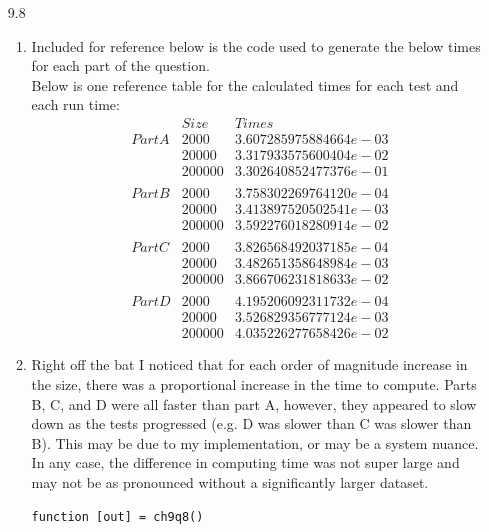 \documentclass[11pt,a4paper]{article}
\begin{document}
\begin{itemize}
			\item[9.8]
				\begin{enumerate} [label={\alph*)}]
					\item Included for reference below is the code used to generate the below times for each part of the question. \\ Below is one reference table for the calculated times for each test and each run time:
					$$\begin{array}{ccc}
						       & Size & Times \\ \hline
						Part A & 2000    & 3.607285975884664e-03 \\
						       & 20000   & 3.317933575600404e-02 \\
						       & 200000  & 3.302640852477376e-01 \\
						       &         &						 \\
						Part B & 2000    & 3.758302269764120e-04 \\
						       & 20000   & 3.413897520502541e-03 \\
						       & 200000  & 3.592276018280914e-02 \\
						       &         &						 \\
						Part C & 2000    & 3.826568492037185e-04 \\
						       & 20000   & 3.482651358648984e-03 \\
						       & 200000  & 3.866706231818633e-02 \\
						       &         &						 \\
						Part D & 2000    & 4.195206092311732e-04 \\
						       & 20000   & 3.526829356777124e-03 \\
						       & 200000  & 4.035226277658426e-02 
		
					\end{array}$$
					\item Right off the bat I noticed that for each order of magnitude increase in the size, there was a proportional increase in the time to compute. Parts B, C, and D were all faster than part A, however, they appeared to slow down as the tests progressed (e.g. D was slower than C was slower than B). This may be due to my implementation, or may be a system nuance. In any case, the difference in computing time was not super large and may not be as pronounced without a significantly larger dataset.
					\\
					\begin{lstlisting}
function [out] = ch9q8()


\end{lstlisting}$$
\end{enumerate}
\end{itemize}
\end{document}
